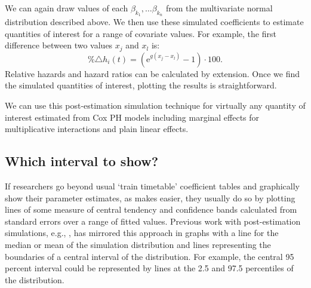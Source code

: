 \documentclass[nojss]{jss}\usepackage[]{graphicx}\usepackage[]{color}
\begin{document}
We can again draw values of each $\beta_{k_{1}}, \ldots \beta_{k_{n}}$ from the multivariate normal distribution described above. We then use these simulated coefficients to estimate quantities of interest for a range of covariate values. For example, the first difference between two values $x_{j}$ and $x_{l}$ is:
%
\begin{equation}
    \%\triangle h_{i}(t) = (\mathrm{e}^{g(x_{j} - x_{l})} - 1) \cdot 100.
\end{equation}
%
Relative hazards and hazard ratios can be calculated by extension. Once we find the simulated quantities of interest, plotting the results is straightforward.

We can use this post-estimation simulation technique for virtually any quantity of interest estimated from Cox PH models including marginal effects for multiplicative interactions and plain linear effects.

\subsection{Which interval to show?}

If researchers go beyond usual `train timetable' coefficient tables and graphically show their parameter estimates, as  makes easier, they usually do so by plotting lines of some measure of central tendency and confidence bands calculated from standard errors over a range of fitted values. Previous work with post-estimation simulations, e.g., \cite{Licht2011}, has mirrored this approach in graphs with a line for the median or mean of the simulation distribution and lines representing the boundaries of a central interval of the distribution. For example, the central 95 percent interval could be represented by lines at the 2.5 and 97.5 percentiles of the distribution.
\end{document}
